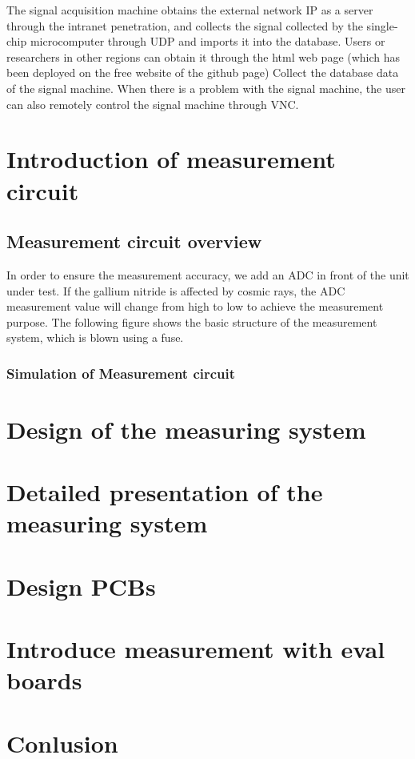 The signal acquisition machine obtains the external network IP as a server through the intranet penetration, and collects the signal collected by the single-chip microcomputer through UDP and imports it into the database. Users or researchers in other regions can obtain it through the html web page (which has been deployed on the free website of the github page) Collect the database data of the signal machine. When there is a problem with the signal machine, the user can also remotely control the signal machine through VNC.

 
\chapter{Introduction of measurement circuit}
\label{chap:Introduction of measurement circuit}


\section{Measurement circuit overview}
\label{sec:Measurement circuit overview}
In order to ensure the measurement accuracy, we add an ADC in front of the unit under test. If the gallium nitride is affected by cosmic rays, the ADC measurement value will change from high to low to achieve the measurement purpose. The following figure shows the basic structure of the measurement system, which is blown using a fuse.

\subsection{Simulation of Measurement circuit}
\label{sec:Simulation of Measurement circuit}

\section{ }
\label{sec: }

\chapter{Design of the measuring system}
\label{chap:Design of the measuring system}

\chapter{Detailed presentation of the measuring system}
\label{chap:Detailed presentation of the measuring system}


\chapter{Design PCBs}
\label{chap:Design PCBs}

\chapter{Introduce measurement with eval boards }
\label{chap:Introduce measurement with eval boards }
 

\chapter{Conlusion}
\label{chap:Conlusion}
 
